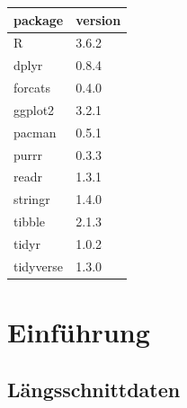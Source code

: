 \documentclass[]{book}
\newenvironment{Shaded}{\begin{snugshade}}{\end{snugshade}}
\newcommand{\CommentTok}[1]{\textcolor[rgb]{0.56,0.35,0.01}{\textit{#1}}}
\newcommand{\ControlFlowTok}[1]{\textcolor[rgb]{0.13,0.29,0.53}{\textbf{#1}}}
\newcommand{\DataTypeTok}[1]{\textcolor[rgb]{0.13,0.29,0.53}{#1}}
\newcommand{\KeywordTok}[1]{\textcolor[rgb]{0.13,0.29,0.53}{\textbf{#1}}}
\newcommand{\NormalTok}[1]{#1}
\newcommand{\OperatorTok}[1]{\textcolor[rgb]{0.81,0.36,0.00}{\textbf{#1}}}
\newcommand{\StringTok}[1]{\textcolor[rgb]{0.31,0.60,0.02}{#1}}
\begin{document}
\begin{Shaded}
\end{Shaded}

\begin{tabular}{l|l}
\hline
package & version\\
\hline
R & 3.6.2\\
\hline
dplyr & 0.8.4\\
\hline
forcats & 0.4.0\\
\hline
ggplot2 & 3.2.1\\
\hline
pacman & 0.5.1\\
\hline
purrr & 0.3.3\\
\hline
readr & 1.3.1\\
\hline
stringr & 1.4.0\\
\hline
tibble & 2.1.3\\
\hline
tidyr & 1.0.2\\
\hline
tidyverse & 1.3.0\\
\hline
\end{tabular}

\hypertarget{einfuxfchrung}{%
\chapter{Einführung}\label{einfuxfchrung}}

\hypertarget{luxe4ngsschnittdaten}{%
\section{Längsschnittdaten}\label{luxe4ngsschnittdaten}}
\end{document}

